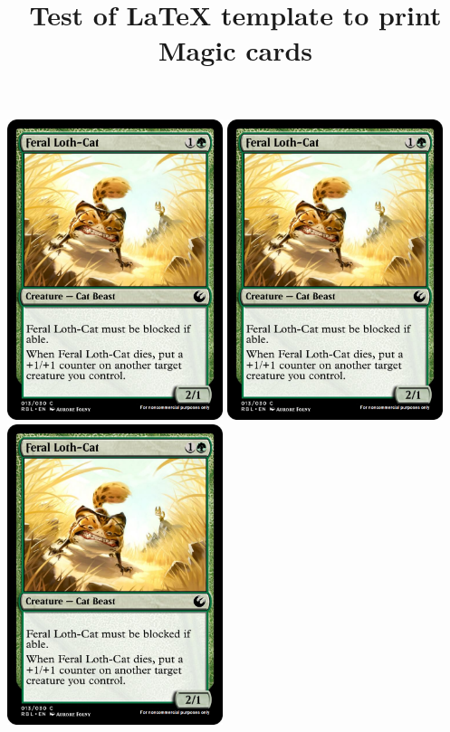 \documentclass[a4paper,12pt]{article}
\title{Test of LaTeX template to print Magic cards}
\begin{document}
\thispagestyle{empty}


\includegraphics[width=63mm,height=88mm]{images/Feral_Loth-Cat.png}
\includegraphics[width=63mm,height=88mm]{images/Feral_Loth-Cat.png}
\includegraphics[width=63mm,height=88mm]{images/Feral_Loth-Cat.png}
\end{document}
